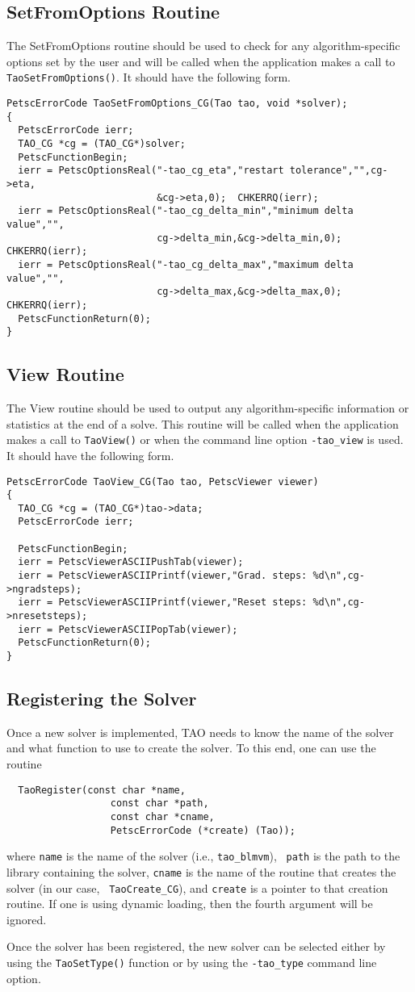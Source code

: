 \subsection{SetFromOptions Routine}
The SetFromOptions routine should be used to check for any 
algorithm-specific options set 
by the user and will be called when the application makes a call
to {\tt TaoSetFromOptions()}.  It should have the following form.
\begin{verbatim}
PetscErrorCode TaoSetFromOptions_CG(Tao tao, void *solver);
{
  PetscErrorCode ierr;
  TAO_CG *cg = (TAO_CG*)solver;
  PetscFunctionBegin;
  ierr = PetscOptionsReal("-tao_cg_eta","restart tolerance","",cg->eta,
                          &cg->eta,0);  CHKERRQ(ierr);
  ierr = PetscOptionsReal("-tao_cg_delta_min","minimum delta value","",
                          cg->delta_min,&cg->delta_min,0); CHKERRQ(ierr);
  ierr = PetscOptionsReal("-tao_cg_delta_max","maximum delta value","",
                          cg->delta_max,&cg->delta_max,0); CHKERRQ(ierr);
  PetscFunctionReturn(0);
}
\end{verbatim}

\subsection{View Routine}
The View routine should be used to output any algorithm-specific information
or statistics at the end of a solve.
This routine will be called when the application makes a call to 
{\tt TaoView()} or when the command line option {\tt -tao\_view} is used.
It should have the following form.
\begin{verbatim}
PetscErrorCode TaoView_CG(Tao tao, PetscViewer viewer)
{ 
  TAO_CG *cg = (TAO_CG*)tao->data;
  PetscErrorCode ierr;

  PetscFunctionBegin;
  ierr = PetscViewerASCIIPushTab(viewer);
  ierr = PetscViewerASCIIPrintf(viewer,"Grad. steps: %d\n",cg->ngradsteps);
  ierr = PetscViewerASCIIPrintf(viewer,"Reset steps: %d\n",cg->nresetsteps);
  ierr = PetscViewerASCIIPopTab(viewer);
  PetscFunctionReturn(0);
}
\end{verbatim}


\subsection{Registering the Solver}
Once a new solver is implemented, TAO needs to know the name of
the solver and what function to use to create the solver.  To this end, one
can use the routine
\begin{verbatim}
  TaoRegister(const char *name, 
                  const char *path,
                  const char *cname, 
                  PetscErrorCode (*create) (Tao));
\end{verbatim}
\noindent
where {\tt name} is the name of the solver (i.e., {\tt tao\_blmvm}), {\tt
path} is the path to the library containing the solver, {\tt cname} is the
name of the routine that creates the solver (in our case, {\tt
  TaoCreate\_CG}), and {\tt create} is a pointer to that creation
routine.  If one is using dynamic loading, then the fourth argument will be
ignored. 

Once the solver has been registered, the new solver can be selected 
either by using the \texttt{TaoSetType()} function or by using the \texttt{-tao\_type} command line option.



